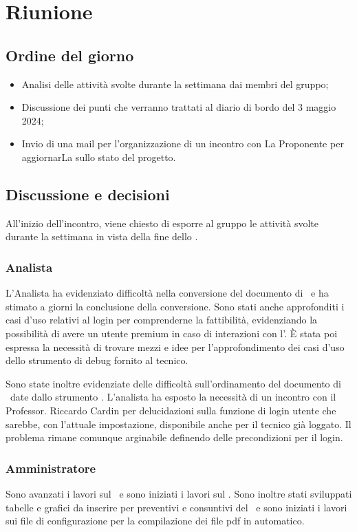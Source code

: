 \section{Riunione}
\subsection{Ordine del giorno}
\begin{itemize}
	\item Analisi delle attività svolte durante la settimana dai membri del gruppo;
	\item Discussione dei punti che verranno trattati al diario di bordo del 3 maggio 2024;
	\item Invio di una mail per l'organizzazione di un incontro con La Proponente per aggiornarLa sullo stato del progetto.
\end{itemize}

\subsection{Discussione e decisioni}
\par All'inizio dell'incontro, viene chiesto di esporre al gruppo le attività svolte durante la settimana in vista della fine dello .
\subsubsection{Analista}
\par L'Analista ha evidenziato difficoltà nella conversione del documento di \AdR\ e ha stimato a giorni la conclusione della conversione. Sono stati anche approfonditi i casi d'uso relativi al login per comprenderne la fattibilità, evidenziando la possibilità di avere un utente premium in caso di interazioni con l'. È stata poi espressa la necessità di trovare mezzi e idee per l'approfondimento dei casi d'uso dello strumento di debug fornito al tecnico.
\par Sono state inoltre evidenziate delle difficoltà sull'ordinamento del documento di \AdR\ date dallo strumento . L'analista ha esposto la necessità di un incontro con il Professor. Riccardo Cardin per delucidazioni sulla funzione di login utente che sarebbe, con l'attuale impostazione, disponibile anche per il tecnico già loggato. Il problema rimane comunque arginabile definendo delle precondizioni per il login. 
\subsubsection{Amministratore}
Sono avanzati i lavori sul \PdP\ e sono iniziati i lavori sul \PdQ. Sono inoltre stati sviluppati tabelle e grafici da inserire per preventivi e consuntivi del \PdP\ e sono iniziati i lavori sui file di configurazione per la compilazione dei file pdf in automatico.

